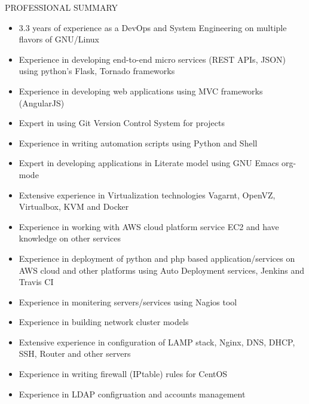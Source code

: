 \documentclass{resume} %
\begin{document}
\begin{rSection}{PROFESSIONAL SUMMARY}
  
  \begin{itemize}
    
  \item 3.3 years of experience as a DevOps and System
    Engineering on multiple flavors of GNU/Linux
    
  \item Experience in developing end-to-end micro services
    (REST APIs, JSON) using python's Flask, Tornado
    frameworks
    
  \item Experience in developing web applications using MVC frameworks
    (AngularJS)
    
  \item Expert in using Git Version Control System for projects

  \item Experience in writing automation scripts using Python and Shell

  \item Expert in developing applications in Literate model
    using GNU Emacs org-mode
    
  \item Extensive experience in Virtualization technologies
    Vagarnt, OpenVZ, Virtualbox, KVM and Docker

  \item Experience in working with AWS cloud platform
    service EC2 and have knowledge on other services

  \item Experience in deployment of python and php based
    application/services on AWS cloud and other platforms
    using Auto Deployment services, Jenkins and Travis CI

  \item Experience in monitering servers/services using
    Nagios tool
    
  \item Experience in building network cluster models
    
  \item Extensive experience in configuration of LAMP stack,
    Nginx, DNS, DHCP, SSH, Router and other servers

  \item Experience in writing firewall (IPtable) rules for
    CentOS
    
  \item Experience in LDAP configruation and accounts
    management
    

\end{itemize}
\end{rSection}
\end{document}
